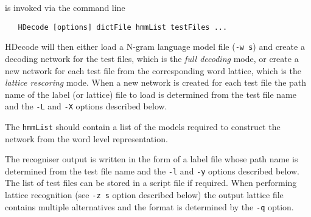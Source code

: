 
 is invoked via the command line
\begin{verbatim}
   HDecode [options] dictFile hmmList testFiles ...
\end{verbatim}
HDecode will then either load a N-gram language model file (\texttt{-w s}) 
and create a decoding network for the test files, which is
the {\em full decoding} mode, or create a
new network for each test file from the corresponding 
word lattice, which is the {\em lattice rescoring} mode. 
When a new network is created for each test file the path name
of the label (or lattice) file to load is determined from the
test file name and the \texttt{-L} and \texttt{-X} options
described below.

The \texttt{hmmList} should contain a list of the models required to
construct the network from the word level representation.

The recogniser output is written in the form of a label file whose
path name is determined from the test file name and the \texttt{-l} and 
\texttt{-y} options described below. The list of test files can be stored 
in a script file if required.
When performing lattice recognition (see \texttt{-z s} option described
below) the output lattice file contains multiple alternatives and the
format is determined by the \texttt{-q} option.

